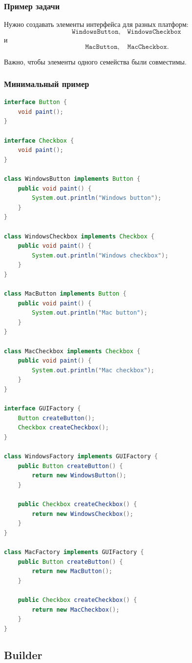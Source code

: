 \documentclass[12pt,a4paper]{article}
\begin{document}
\subsubsection{Пример задачи}

Нужно создавать элементы интерфейса для разных платформ:
\[
\texttt{WindowsButton}, \quad \texttt{WindowsCheckbox}
\]
и
\[
\texttt{MacButton}, \quad \texttt{MacCheckbox}.
\]

Важно, чтобы элементы одного семейства были совместимы.

\subsubsection{Минимальный пример}

\begin{lstlisting}[language=Java,caption={Abstract Factory}]
interface Button {
    void paint();
}

interface Checkbox {
    void paint();
}

class WindowsButton implements Button {
    public void paint() {
        System.out.println("Windows button");
    }
}

class WindowsCheckbox implements Checkbox {
    public void paint() {
        System.out.println("Windows checkbox");
    }
}

class MacButton implements Button {
    public void paint() {
        System.out.println("Mac button");
    }
}

class MacCheckbox implements Checkbox {
    public void paint() {
        System.out.println("Mac checkbox");
    }
}

interface GUIFactory {
    Button createButton();
    Checkbox createCheckbox();
}

class WindowsFactory implements GUIFactory {
    public Button createButton() {
        return new WindowsButton();
    }

    public Checkbox createCheckbox() {
        return new WindowsCheckbox();
    }
}

class MacFactory implements GUIFactory {
    public Button createButton() {
        return new MacButton();
    }

    public Checkbox createCheckbox() {
        return new MacCheckbox();
    }
}
\end{lstlisting}

\subsection{Builder}
\end{document}
